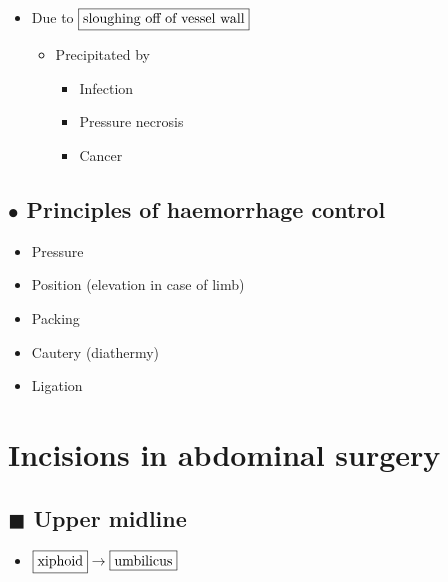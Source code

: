 \documentclass[
  14pt,
]{memoir}
\providecommand{\tightlist}{%
  \setlength{\itemsep}{0pt}\setlength{\parskip}{0pt}}
\begin{document}
\begin{itemize}
\tightlist
\item
  Due to \(\fbox{sloughing off of vessel wall}\)

  \begin{itemize}
  \tightlist
  \item
    Precipitated by

    \begin{itemize}
    \tightlist
    \item
      Infection
    \item
      Pressure necrosis
    \item
      Cancer
    \end{itemize}
  \end{itemize}
\end{itemize}

\hypertarget{bullet-principles-of-haemorrhage-control}{%
\subsection{\texorpdfstring{\(\bullet\) Principles of haemorrhage
control}{\textbackslash bullet Principles of haemorrhage control}}\label{bullet-principles-of-haemorrhage-control}}

\begin{itemize}
\tightlist
\item
  Pressure
\item
  Position (elevation in case of limb)
\item
  Packing
\item
  Cautery (diathermy)
\item
  Ligation
\end{itemize}

\hypertarget{incisions-in-abdominal-surgery}{%
\section{Incisions in abdominal
surgery}\label{incisions-in-abdominal-surgery}}

\hypertarget{blacksquare-upper-midline}{%
\subsection{\texorpdfstring{\(\blacksquare\) Upper
midline}{\textbackslash blacksquare Upper midline}}\label{blacksquare-upper-midline}}

\begin{itemize}
\tightlist
\item
  \(\fbox{xiphoid}\rightarrow\fbox{umbilicus}\)
\end{itemize}
\end{document}
